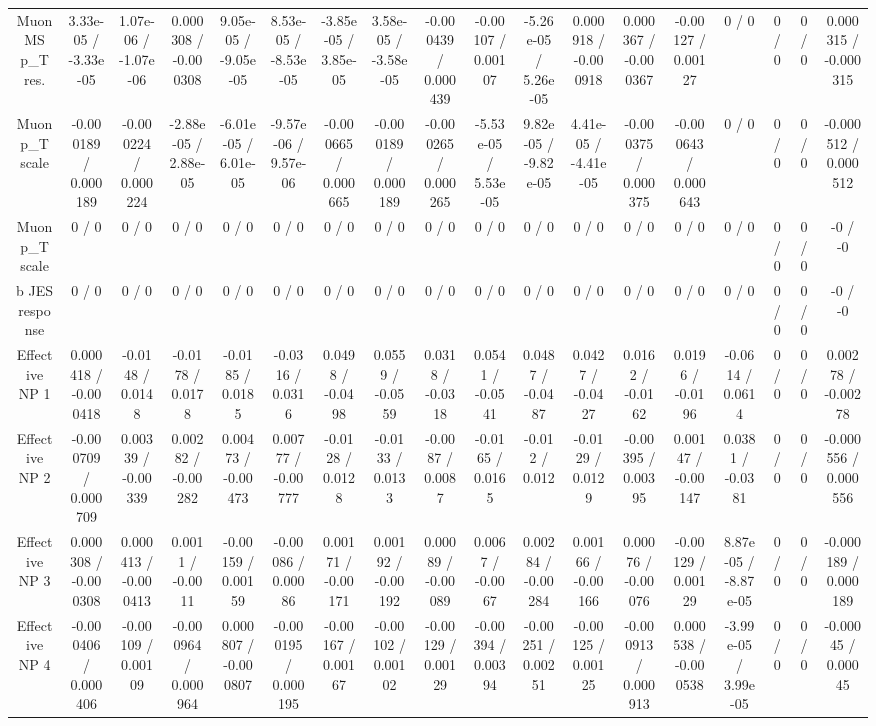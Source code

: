 \documentclass[10pt]{article}
\begin{document}
\begin{table}[htbp]
\begin{center}
\begin{tabular}{|c|c|c|c|c|c|c|c|c|c|c|c|c|c|c|c|c|c|}
  Muon MS p_{T} res. & 3.33e-05 / -3.33e-05 & 1.07e-06 / -1.07e-06 & 0.000308 / -0.000308 & 9.05e-05 / -9.05e-05 & 8.53e-05 / -8.53e-05 & -3.85e-05 / 3.85e-05 & 3.58e-05 / -3.58e-05 & -0.000439 / 0.000439 & -0.00107 / 0.00107 & -5.26e-05 / 5.26e-05 & 0.000918 / -0.000918 & 0.000367 / -0.000367 & -0.00127 / 0.00127 & 0 / 0 & 0 / 0 & 0 / 0 & 0.000315 / -0.000315 \\ 
  Muon p_{T} scale & -0.000189 / 0.000189 & -0.000224 / 0.000224 & -2.88e-05 / 2.88e-05 & -6.01e-05 / 6.01e-05 & -9.57e-06 / 9.57e-06 & -0.000665 / 0.000665 & -0.000189 / 0.000189 & -0.000265 / 0.000265 & -5.53e-05 / 5.53e-05 & 9.82e-05 / -9.82e-05 & 4.41e-05 / -4.41e-05 & -0.000375 / 0.000375 & -0.000643 / 0.000643 & 0 / 0 & 0 / 0 & 0 / 0 & -0.000512 / 0.000512 \\ 
  Muon p_{T} scale & 0 / 0 & 0 / 0 & 0 / 0 & 0 / 0 & 0 / 0 & 0 / 0 & 0 / 0 & 0 / 0 & 0 / 0 & 0 / 0 & 0 / 0 & 0 / 0 & 0 / 0 & 0 / 0 & 0 / 0 & 0 / 0 & -0 / -0 \\ 
  b JES response & 0 / 0 & 0 / 0 & 0 / 0 & 0 / 0 & 0 / 0 & 0 / 0 & 0 / 0 & 0 / 0 & 0 / 0 & 0 / 0 & 0 / 0 & 0 / 0 & 0 / 0 & 0 / 0 & 0 / 0 & 0 / 0 & -0 / -0 \\ 
  Effective NP 1 & 0.000418 / -0.000418 & -0.0148 / 0.0148 & -0.0178 / 0.0178 & -0.0185 / 0.0185 & -0.0316 / 0.0316 & 0.0498 / -0.0498 & 0.0559 / -0.0559 & 0.0318 / -0.0318 & 0.0541 / -0.0541 & 0.0487 / -0.0487 & 0.0427 / -0.0427 & 0.0162 / -0.0162 & 0.0196 / -0.0196 & -0.0614 / 0.0614 & 0 / 0 & 0 / 0 & 0.00278 / -0.00278 \\ 
  Effective NP 2 & -0.000709 / 0.000709 & 0.00339 / -0.00339 & 0.00282 / -0.00282 & 0.00473 / -0.00473 & 0.00777 / -0.00777 & -0.0128 / 0.0128 & -0.0133 / 0.0133 & -0.0087 / 0.0087 & -0.0165 / 0.0165 & -0.012 / 0.012 & -0.0129 / 0.0129 & -0.00395 / 0.00395 & 0.00147 / -0.00147 & 0.0381 / -0.0381 & 0 / 0 & 0 / 0 & -0.000556 / 0.000556 \\ 
  Effective NP 3 & 0.000308 / -0.000308 & 0.000413 / -0.000413 & 0.0011 / -0.0011 & -0.00159 / 0.00159 & -0.00086 / 0.00086 & 0.00171 / -0.00171 & 0.00192 / -0.00192 & 0.00089 / -0.00089 & 0.0067 / -0.0067 & 0.00284 / -0.00284 & 0.00166 / -0.00166 & 0.00076 / -0.00076 & -0.00129 / 0.00129 & 8.87e-05 / -8.87e-05 & 0 / 0 & 0 / 0 & -0.000189 / 0.000189 \\ 
  Effective NP 4 & -0.000406 / 0.000406 & -0.00109 / 0.00109 & -0.000964 / 0.000964 & 0.000807 / -0.000807 & -0.000195 / 0.000195 & -0.00167 / 0.00167 & -0.00102 / 0.00102 & -0.00129 / 0.00129 & -0.00394 / 0.00394 & -0.00251 / 0.00251 & -0.00125 / 0.00125 & -0.000913 / 0.000913 & 0.000538 / -0.000538 & -3.99e-05 / 3.99e-05 & 0 / 0 & 0 / 0 & -0.00045 / 0.00045 \\ 

\end{tabular}
\end{center}
\end{table}
\end{document}
